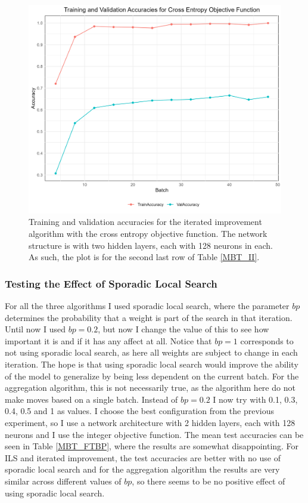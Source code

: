 \begin{figure}[H]
    \centering
    \includegraphics[width=1\linewidth]{Figures/MBT_II_CROSS_ENTROPY.png}
    \caption{Training and validation accuracies for the iterated improvement algorithm with the cross entropy objective function. The network structure is with two hidden layers, each with 128 neurons in each. As such, the plot is for the second last row of Table \ref{MBT_II}. }
    \label{MBT_II_CROSS_ENTROPY_FUNCTION}
\end{figure}




\subsubsection{Testing the Effect of Sporadic Local Search}
For all the three algorithms I used sporadic local search, where the parameter $bp$ determines the probability that a weight is part of the search in that iteration. Until now I used $bp=0.2$, but now I change the value of this to see how important it is and if it has any affect at all. Notice that $bp=1$ corresponds to not using sporadic local search, as here all weights are subject to change in each iteration. The hope is that using sporadic local search would improve the ability of the model to generalize by being less dependent on the current batch. For the aggregation algorithm, this is not necessarily true, as the algorithm here do not make moves based on a single batch. Instead of $bp=0.2$ I now try with 0.1, 0.3, 0.4, 0.5 and 1 as values. I choose the best configuration from the previous experiment, so I use a network architecture with 2 hidden layers, each with 128 neurons and I use the integer objective function. The mean test accuracies can be seen in Table \ref{MBT_FTBP}, where the results are somewhat disappointing. For ILS and iterated improvement, the test accuracies are better with no use of sporadic local search and for the aggregation algorithm the results are very similar across different values of $bp$, so there seems to be no positive effect of using sporadic local search. 


